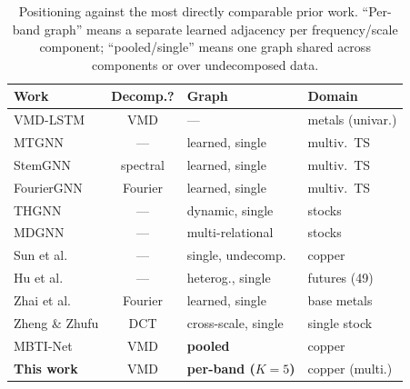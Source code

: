 \documentclass[journal]{IEEEtran}
\begin{document}
\begin{table}[t]
\centering
\caption{Positioning against the most directly comparable prior work. ``Per-band graph'' means a separate learned adjacency per frequency/scale component; ``pooled/single'' means one graph shared across components or over undecomposed data.}
\label{tab:related}
\small
\begin{tabular}{@{}p{1.75cm}cp{2.3cm}p{1.65cm}@{}}
\toprule
Work & Decomp.? & Graph & Domain \\
\midrule
VMD-LSTM \citep{Liu2020} & VMD & --- & metals (univar.) \\
MTGNN \citep{Wu2020mtgnn} & --- & learned, single & multiv.\ TS \\
StemGNN \citep{Cao2020} & spectral & learned, single & multiv.\ TS \\
FourierGNN \citep{Yi2023} & Fourier & learned, single & multiv.\ TS \\
THGNN \citep{Xiang2023} & --- & dynamic, single & stocks \\
MDGNN \citep{Qian2024} & --- & multi-relational & stocks \\
Sun et al.\ \citeyear{Sun2025} & --- & single, undecomp. & copper \\
Hu et al.\ \citeyear{Hu2023} & --- & heterog., single & futures (49) \\
Zhai et al.\ \citeyear{Zhai2024} & Fourier & learned, single & base metals \\
Zheng \& Zhufu \citeyear{ZhengZhufu2025} & DCT & cross-scale, single & single stock \\
MBTI-Net \citep{LiLiu2026} & VMD & \textbf{pooled} & copper \\
\textbf{This work} & VMD & \textbf{per-band ($K{=}5$)} & copper (multi.) \\
\bottomrule
\end{tabular}

\end{table}
\end{document}

